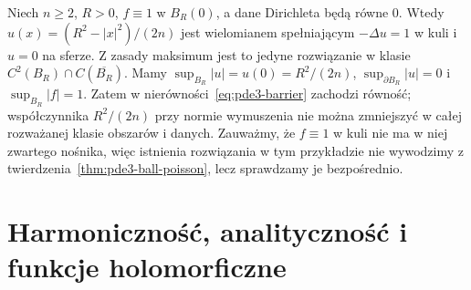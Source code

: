 \begin{przyklad}
Niech $n\geq2$, $R>0$, $f\equiv1$ w $B_R(0)$,
a dane Dirichleta będą równe $0$.
Wtedy $u(x)=(R^2-|x|^2)/(2n)$ jest wielomianem
spełniającym $-\Delta u=1$ w kuli i $u=0$ na sferze.
Z zasady maksimum jest to jedyne rozwiązanie
w klasie $C^2(B_R)\cap C(\overline{B_R})$.
Mamy $\sup_{B_R}|u|=u(0)=R^2/(2n)$,
$\sup_{\partial B_R}|u|=0$ i $\sup_{B_R}|f|=1$.
Zatem w nierówności~\eqref{eq:pde3-barrier} zachodzi
równość; współczynnika $R^2/(2n)$ przy normie wymuszenia
nie można zmniejszyć w całej rozważanej klasie
obszarów i danych.
Zauważmy, że $f\equiv1$ w kuli nie ma w niej zwartego
nośnika, więc istnienia rozwiązania w tym przykładzie
nie wywodzimy z twierdzenia~\ref{thm:pde3-ball-poisson},
lecz sprawdzamy je bezpośrednio.
\end{przyklad}

\section{Harmoniczność, analityczność i funkcje holomorficzne}
\label{sec:pde3-analytic}

